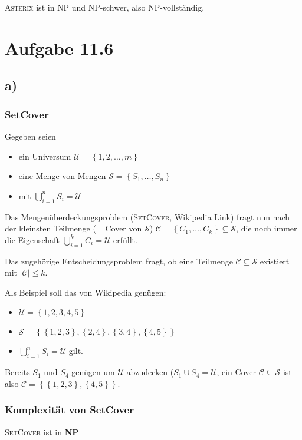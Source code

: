 \documentclass{article}
\begin{document}
\bigskip

\textsc{Asterix} ist in NP und NP-schwer, also NP-vollständig.



\section*{Aufgabe 11.6}
\subsection*{a)}
\subsubsection*{SetCover}
Gegeben seien
\begin{itemize}
	\item ein Universum $\mathcal{U} = \left\{1, 2, \dots, m\right\}$
  \item eine Menge von Mengen $\mathcal{S} = \left\{S_1, \dots, S_n\right\}$
  \item mit $\bigcup\limits_{i=1}^n S_i = \mathcal{U}$
\end{itemize}

Das Mengenüberdeckungsproblem (\textsc{SetCover}, \href{http://en.wikipedia.org/wiki/Set_cover_problem}{Wikipedia Link}) fragt nun nach der kleinsten Teilmenge (= Cover von $\mathcal{S}$) $\mathcal{C} = \left\{C_1, \dots, C_k\right\} \subseteq \mathcal{S}$, die noch immer die Eigenschaft $\bigcup\limits_{i=1}^k C_i = \mathcal{U}$ erfüllt.

Das zugehörige Entscheidungsproblem fragt, ob eine Teilmenge $\mathcal{C} \subseteq \mathcal{S}$ existiert mit $|\mathcal{C}| \leq k$.

Als Beispiel soll das von Wikipedia genügen:
\begin{itemize}
	\item $\mathcal{U} = \left\{1, 2, 3, 4, 5\right\}$
  \item $\mathcal{S} = \left\{ \left\{ 1, 2, 3 \right\}, \left\{ 2, 4 \right\}, \left\{ 3, 4 \right\}, \left\{ 4, 5 \right\} \right\}$
  \item $\bigcup\limits_{i=1}^n S_i = \mathcal{U}$ gilt.
\end{itemize}
Bereits $S_1$ und $S_4$ genügen um $\mathcal{U}$ abzudecken ($S_1 \cup S_4 = \mathcal{U}$, ein Cover $\mathcal{C} \subseteq \mathcal{S}$ ist also $\mathcal{C} = \left\{ \left\{ 1, 2, 3 \right\}, \left\{ 4, 5 \right\} \right\}$.

\subsubsection*{Komplexität von SetCover}
\textsc{SetCover} ist in \textbf{NP}
\end{document}
